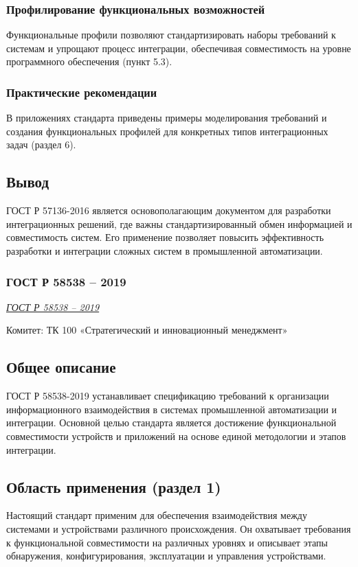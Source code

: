 \subsubsection*{Профилирование функциональных возможностей}
Функциональные профили позволяют стандартизировать наборы требований к системам и упрощают процесс интеграции,
обеспечивая совместимость на уровне программного обеспечения (пункт 5.3).

\subsubsection*{Практические рекомендации}
В приложениях стандарта приведены примеры моделирования требований и создания функциональных профилей для конкретных типов интеграционных задач (раздел 6).

\subsection*{Вывод}
ГОСТ Р 57136-2016 является основополагающим документом для разработки интеграционных решений,
где важны стандартизированный обмен информацией и совместимость систем.
Его применение позволяет повысить эффективность разработки и интеграции сложных систем в промышленной автоматизации.



\subsubsection{ГОСТ Р 58538 -- 2019}

\emph{\href{https://meganorm.ru/Data/718/71869.pdf}{ГОСТ Р 58538 -- 2019}}
\par
Комитет: ТК 100 «Стратегический и инновационный менеджмент»


\subsection*{Общее описание}
ГОСТ Р 58538-2019 устанавливает спецификацию требований к организации информационного взаимодействия в системах промышленной
автоматизации и интеграции.
Основной целью стандарта является достижение функциональной совместимости устройств и приложений на основе единой методологии и этапов интеграции.

\subsection*{Область применения (раздел 1)}
Настоящий стандарт применим для обеспечения взаимодействия между системами и устройствами различного происхождения.
Он охватывает требования к функциональной совместимости на различных уровнях и описывает этапы обнаружения, конфигурирования, эксплуатации и управления устройствами.

